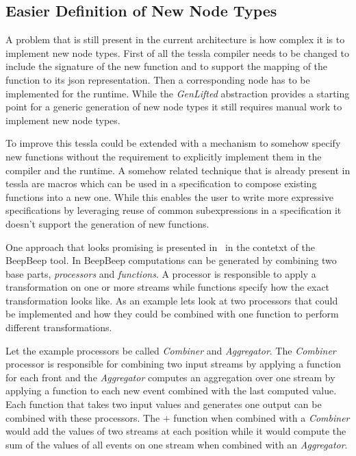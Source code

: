 
\subsection{Easier Definition of New Node Types}
\label{sec:conclusion:further_work:node_definition}

A problem that is still present in the current architecture is how complex it is to implement new node types.
First of all the \gls{tessla} compiler needs to be changed to include the signature of the new function and to support the mapping of the function to its \gls{json} representation.
Then a corresponding node has to be implemented for the runtime.
While the \emph{GenLifted} abstraction provides a starting point for a generic generation of new node types it still requires manual work to implement new node types.

To improve this \gls{tessla} could be extended with a mechanism to somehow specify new functions without the requirement to explicitly implement them in the compiler and the runtime.
A somehow related technique that is already present in \gls{tessla} are macros which can be used in a specification to compose existing functions into a new one.
While this enables the user to write more expressive specifications by leveraging reuse of common subexpressions in a specification it doesn't support the generation of new functions.

One approach that looks promising is presented in~\cite{Hall2011} in the contetxt of the BeepBeep tool.
In BeepBeep computations can be generated by combining two base parts, \emph{processors} and \emph{functions}.
A processor is responsible to apply a transformation on one or more streams while functions specify how the exact transformation looks like.
As an example lets look at two processors that could be implemented and how they could be combined with one function to perform different transformations.

Let the example processors be called \emph{Combiner} and \emph{Aggregator}.
The \emph{Combiner} processor is responsible for combining two input streams by applying a function for each front and the \emph{Aggregator} computes an aggregation over one stream by applying a function to each new event combined with the last computed value.
Each function that takes two input values and generates one output can be combined with these processors.
The \(+\) function when combined with a \emph{Combiner} would add the values of two streams at each position while it would compute the sum of the values of all events on one stream when combined with an \emph{Aggregator}.

